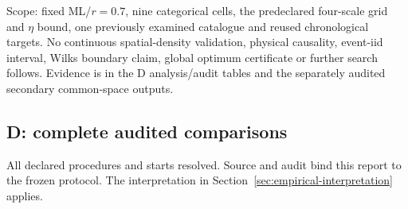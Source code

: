 Scope: fixed ML/$r=0.7$, nine categorical cells, the predeclared four-scale grid and $\eta$ bound, one previously examined catalogue and reused chronological targets. No continuous spatial-density validation, physical causality, event-iid interval, Wilks boundary claim, global optimum certificate or further search follows. Evidence is in the D analysis/audit tables and the separately audited secondary common-space outputs.

\subsection{D: complete audited comparisons}

All declared procedures and starts resolved. Source and audit bind this report to the frozen protocol. The interpretation in Section~\ref{sec:empirical-interpretation} applies.

